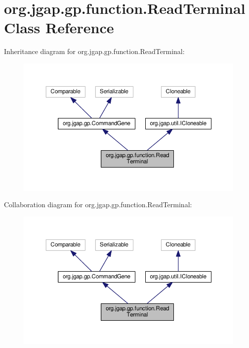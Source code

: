 \hypertarget{classorg_1_1jgap_1_1gp_1_1function_1_1_read_terminal}{\section{org.\-jgap.\-gp.\-function.\-Read\-Terminal Class Reference}
\label{classorg_1_1jgap_1_1gp_1_1function_1_1_read_terminal}
}


Inheritance diagram for org.\-jgap.\-gp.\-function.\-Read\-Terminal\-:
\nopagebreak
\begin{figure}[H]
\begin{center}
\leavevmode
\includegraphics[width=350pt]{classorg_1_1jgap_1_1gp_1_1function_1_1_read_terminal__inherit__graph}
\end{center}
\end{figure}


Collaboration diagram for org.\-jgap.\-gp.\-function.\-Read\-Terminal\-:
\nopagebreak
\begin{figure}[H]
\begin{center}
\leavevmode
\includegraphics[width=350pt]{classorg_1_1jgap_1_1gp_1_1function_1_1_read_terminal__coll__graph}
\end{center}
\end{figure}
